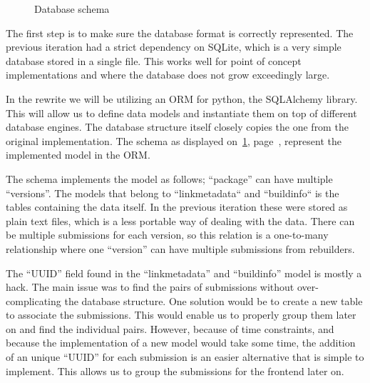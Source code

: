 \documentclass[../Main/thesis.tex]{subfiles}
\begin{document}
\begin{figure}[H]
\caption{Database schema}
\label{fig:schema}
\end{figure}

The first step is to make sure the database format is correctly represented. The
previous iteration had a strict dependency on SQLite, which is a very simple
database stored in a single file. This works well for point of concept
implementations and where the database does not grow exceedingly large.

In the rewrite we will be utilizing an ORM for python, the SQLAlchemy library.
This will allow us to define data models and instantiate them on top of
different database engines. The database structure itself closely copies the one
from the original implementation. The schema as displayed on~\ref{fig:schema},
page~\pageref{fig:schema}, represent the implemented model in the ORM.

The schema implements the model as follows; ``package'' can have multiple
``versions''. The models that belong to ``linkmetadata`` and ``buildinfo`` is
the tables containing the data itself. In the previous iteration these were
stored as plain text files, which is a less portable way of dealing with the
data. There can be multiple submissions for each version, so this relation is a
one-to-many relationship where one ``version'' can have multiple submissions
from rebuilders.

The ``UUID'' field found in the ``linkmetadata'' and ``buildinfo'' model is
mostly a hack. The main issue was to find the pairs of submissions without
over-complicating the database structure. One solution would be to create a new
table to associate the submissions. This would enable us to properly group them
later on and find the individual pairs. However, because of time constraints,
and because the implementation of a new model would take some time, the addition
of an unique ``UUID'' for each submission is an easier alternative that is
simple to implement. This allows us to group the submissions for the frontend
later on.
\end{document}
